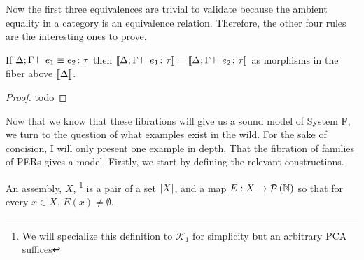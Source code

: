 Now the first three equivalences are trivial to validate because the
ambient equality in a category is an equivalence relation. Therefore,
the other four rules are the interesting ones to prove.
\begin{thm}\label{thm:systemf:soundness}
  If $\Delta; \Gamma \vdash e_1 \equiv e_2 \colon \tau$ then
  $\llbracket \Delta; \Gamma \vdash e_1 \colon \tau \rrbracket = \llbracket \Delta; \Gamma \vdash e_2 \colon \tau \rrbracket$
  as morphisms in the fiber above $\llbracket \Delta \rrbracket$.
\end{thm}
\begin{proof}
  todo
\end{proof}

Now that we know that these fibrations will give us a sound model of
System F, we turn to the question of what examples exist in the
wild. For the sake of concision, I will only present one example in
depth. That the fibration of families of PERs gives a model. Firstly,
we start by defining the relevant constructions.
\begin{defn}\label{defn:systemf:assembly}
  An assembly, $X$, \footnote{We will specialize this definition to
    $\mathcal{K}_1$ for simplicity but an arbitrary PCA suffices} is a
  pair of a set $\left\vert X \right\vert$, and a map $E : X \to \mathcal{P}\left(\mathbb{N}\right)$ so
  that for every $x \in X$, $E(x) \neq \emptyset$.
\end{defn}

